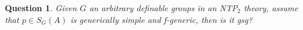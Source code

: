 \documentclass{amsart}
\numberwithin{equation}{section}
\newtheorem{fait}[thm]{Fact}
\newtheorem{question}[thm]{Question}
\theoremstyle{definition}
\theoremstyle{mystyle}
\theoremstyle{remark}
\newcommand{\monster}{\mathcal U}
\begin{document}
\begin{question}
Given $G$ an arbitrary definable groups in an NTP$_2$ theory, assume that $p\in S_G(A)$ is generically simple and f-generic, then is it gsg?
\end{question}
%
%
%
%
%
%
%
%
\end{document}
